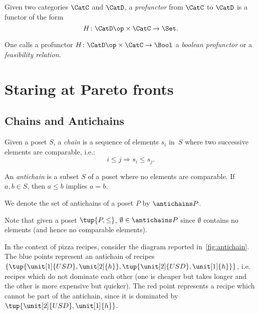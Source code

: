 \begin{shaded}
\begin{definition}[Profunctor]
\label{def:profunctor}
Given two categories $\CatC$ and $\CatD$, a \emph{profunctor} from $\CatC$ to $\CatD$ is a functor of the form
\begin{equation}
    H\colon \CatD\op \times \CatC \to \Set.
\end{equation}
\end{definition}
\begin{remark}
One calls a profunctor $H\colon \CatD\op \times \CatC \to \Bool$ a \emph{boolean profunctor} or a \emph{feasibility relation}.
\end{remark}
\end{shaded}




\clearpage
\section{Staring at Pareto fronts}

\subsection{Chains and Antichains} \label{sec:chains-antichains}


\begin{definition}
\label{def:chain}
Given a poset $S$, a \emph{chain} is a sequence of elements ${s_i}$ in~$S$ where two successive elements are comparable, i.e.:
\begin{equation}
    i \leq j \Rightarrow s_i \leq s_j.
\end{equation}
\end{definition}

 
\begin{definition}
\label{def:antichain}
An \emph{antichain} is a subset $S$ of a poset where no elements are comparable. If $a,b \in S$, then $a \leq b$ implies $a=b$.
\end{definition}
\begin{remark}
We denote the set of antichains of a poset $P$ by $\antichains P$.
\end{remark}
\begin{remark}
Note that given a poset $\tup{P,\leq}$, $\emptyset \in \antichains P$ since $\emptyset$ contains no elements (and hence no comparable elements).
\end{remark}

In the context of pizza recipes, consider the diagram reported in~\cref{fig:antichain}. The blue points represent an antichain of recipes $\{\tup{\unit[1]{USD},\unit[2]{h}},\tup{\unit[2]{USD},\unit[1]{h}}\}$, i.e. recipes which do not dominate each other (one is cheaper but takes longer and the other is more expensive but quicker). The red point represents a recipe which cannot be part of the antichain, since it is dominated by $\tup{\unit[2]{USD},\unit[1]{h}}$. 

